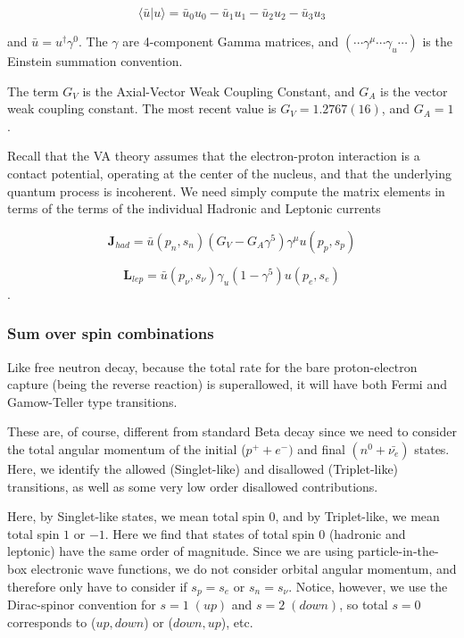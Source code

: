\documentclass[%
 aip,
 jmp,%
 amsmath,amssymb,
 reprint,%
]{revtex4-1}
\begin{document}
$$\langle\bar{u}|u\rangle=\bar{u}_{0}u_{0}-\bar{u}_{1}u_{1}-\bar{u}_{2}u_{2}-\bar{u}_{3}u_{3}$$

and $\bar{u}=u^{\dagger}\gamma^{0}$.  The $\gamma$ are 4-component Gamma matrices, and  $(\cdots\gamma^{\mu}\cdots\gamma_{u}\cdots)$ is the Einstein summation convention. 

The term $G_{V}$ is the Axial-Vector Weak Coupling Constant, and $G_{A}$ is the vector weak coupling
constant.  The most recent value is $G_{V}=1.2767(16)$, and $G_{A}=1$ \cite{vacoupling}.

Recall that the VA theory assumes that the electron-proton interaction is a contact potential, operating at the center of the nucleus, and that the underlying quantum process is incoherent.    We need simply compute the matrix elements in terms of the terms of the individual Hadronic and Leptonic currents

$$\mathbf{J}_{had}=\bar{u}(p_{n},s_{n})(G_{V}-G_{A}\gamma^{5})\gamma^{\mu}u(p_{p},s_{p})$$

$$\mathbf{L}_{lep}=\bar{u}(p_{\nu},s_{\nu})\gamma_{u}(1-\gamma^{5})u(p_{e},s_{e})$$.

\subsubsection{Sum over spin combinations}

Like free neutron decay, because the total  rate for the bare proton-electron capture (being the reverse reaction)  is superallowed,  it will have both Fermi and Gamow-Teller type transitions.

These are, of course, different from standard Beta decay since we need to consider the total angular momentum of the initial ($p^{+}+e^{-})$ and final $(n^{0}+\bar{\nu_{e}})$ states.  
Here, we identify the allowed (Singlet-like) and disallowed (Triplet-like) transitions, as well as some very low order disallowed contributions.  


Here, by Singlet-like states, we  mean total spin 0, and by Triplet-like, we mean total  spin $1$ or $-1$.  Here we find that states of total spin 0 (hadronic and leptonic) have the same order of magnitude.   Since we are using particle-in-the-box electronic wave functions,  we do not consider orbital angular momentum, and therefore only have to consider if $s_{p}=s_{e}$ or  $s_{n}=s_{\nu}$. Notice, however, we use the Dirac-spinor convention for $s=1\;(up)$ and $s=2\;(down)$, so total $s=0$ corresponds to ($up,down$) or ($down,up$), etc.
\end{document}
